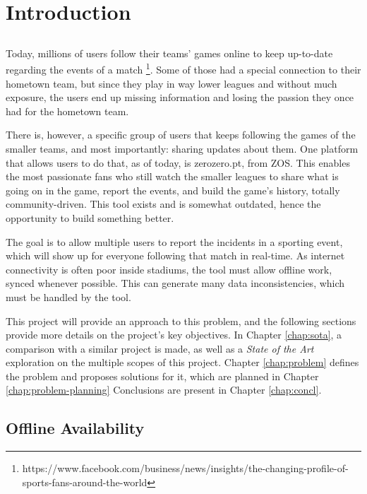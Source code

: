 \chapter{Introduction} \label{chap:intro}

\section*{}

Today, millions of users follow their teams' games online to keep up-to-date regarding the events of a match \footnote{https://www.facebook.com/business/news/insights/the-changing-profile-of-sports-fans-around-the-world}. Some of those had a special connection to their hometown team, but since they play in way lower leagues and without much exposure, the users end up missing information and losing the passion they once had for the hometown team.

There is, however,  a specific group of users that keeps following the games of the smaller teams, and most importantly: sharing updates about them. One platform that allows users to do that, as of today, is zerozero.pt, from ZOS. This enables the most passionate fans who still watch the smaller leagues to share what is going on in the game, report the events, and build the game's history, totally community-driven. This tool exists and is somewhat outdated, hence the opportunity to build something better.

The goal is to allow multiple users to report the incidents in a sporting event, which will show up for everyone following that match in real-time. As internet connectivity is often poor inside stadiums, the tool must allow offline work, synced whenever possible. This can generate many data inconsistencies, which must be handled by the tool.

This project will provide an approach to this problem, and the following sections provide more details on the project's key objectives. In Chapter \ref{chap:sota}, a comparison with a similar project is made, as well as a \textit{State of the Art} exploration on the multiple scopes of this project. Chapter \ref{chap:problem} defines the problem and proposes solutions for it, which are planned in Chapter \ref{chap:problem-planning} Conclusions are present in Chapter \ref{chap:concl}. 

\section{Offline Availability} \label{sec:offline-avail-intro}

